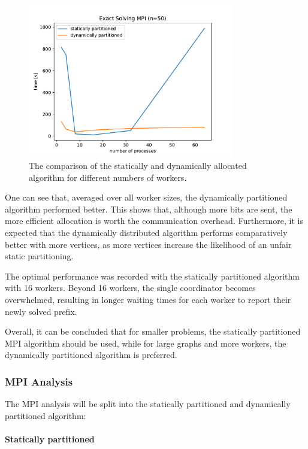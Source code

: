 \begin{figure}[H]
  \centering
  \includegraphics[width=0.8\textwidth]{./assets/exact-mpi.pdf}
  \caption{The comparison of the statically and dynamically allocated algorithm for different numbers of workers.}
\end{figure}

One can see that, averaged over all worker sizes, the dynamically partitioned algorithm performed better. This shows that, although more bits are sent, the more efficient allocation is worth the communication overhead. Furthermore, it is expected that the dynamically distributed algorithm performs comparatively better with more vertices, as more vertices increase the likelihood of an unfair static partitioning.

The optimal performance was recorded with the statically partitioned algorithm with 16 workers. Beyond 16 workers, the single coordinator becomes overwhelmed, resulting in longer waiting times for each worker to report their newly solved prefix.

Overall, it can be concluded that for smaller problems, the statically partitioned \ac{MPI} algorithm should be used, while for large graphs and more workers, the dynamically partitioned algorithm is preferred.

\subsubsection{MPI Analysis}

The \ac{MPI} analysis will be split into the statically partitioned and dynamically partitioned algorithm:

\paragraph{Statically partitioned}

